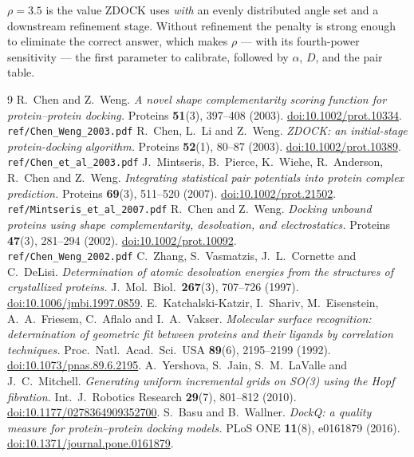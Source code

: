 \documentclass[11pt,a4paper]{article}
\newcommand{\doi}[1]{\href{https://doi.org/#1}{doi:#1}}
\newcommand{\localfile}[1]{\\ \hspace*{1em}\texttt{#1}}
\begin{document}
$\rho = 3.5$ is the value ZDOCK uses \emph{with} an evenly distributed angle set
and a downstream refinement stage. Without refinement the penalty is strong
enough to eliminate the correct answer, which makes $\rho$ --- with its
fourth-power sensitivity --- the first parameter to calibrate, followed by
$\alpha$, $D$, and the pair table.

\begin{thebibliography}{9}
  R.~Chen and Z.~Weng.
  \emph{A novel shape complementarity scoring function for protein--protein
  docking.}
  Proteins \textbf{51}(3), 397--408 (2003). \doi{10.1002/prot.10334}.
  \localfile{ref/Chen\_Weng\_2003.pdf}
  R.~Chen, L.~Li and Z.~Weng.
  \emph{ZDOCK: an initial-stage protein-docking algorithm.}
  Proteins \textbf{52}(1), 80--87 (2003). \doi{10.1002/prot.10389}.
  \localfile{ref/Chen\_et\_al\_2003.pdf}
  J.~Mintseris, B.~Pierce, K.~Wiehe, R.~Anderson, R.~Chen and Z.~Weng.
  \emph{Integrating statistical pair potentials into protein complex
  prediction.}
  Proteins \textbf{69}(3), 511--520 (2007). \doi{10.1002/prot.21502}.
  \localfile{ref/Mintseris\_et\_al\_2007.pdf}
  R.~Chen and Z.~Weng.
  \emph{Docking unbound proteins using shape complementarity, desolvation, and
  electrostatics.}
  Proteins \textbf{47}(3), 281--294 (2002). \doi{10.1002/prot.10092}.
  \localfile{ref/Chen\_Weng\_2002.pdf}
  C.~Zhang, S.~Vasmatzis, J.~L.~Cornette and C.~DeLisi.
  \emph{Determination of atomic desolvation energies from the structures of
  crystallized proteins.}
  J.\ Mol.\ Biol.\ \textbf{267}(3), 707--726 (1997).
  \doi{10.1006/jmbi.1997.0859}.
  E.~Katchalski-Katzir, I.~Shariv, M.~Eisenstein, A.~A.~Friesem, C.~Aflalo and
  I.~A.~Vakser.
  \emph{Molecular surface recognition: determination of geometric fit between
  proteins and their ligands by correlation techniques.}
  Proc.\ Natl.\ Acad.\ Sci.\ USA \textbf{89}(6), 2195--2199 (1992).
  \doi{10.1073/pnas.89.6.2195}.
  A.~Yershova, S.~Jain, S.~M.~LaValle and J.~C.~Mitchell.
  \emph{Generating uniform incremental grids on SO(3) using the Hopf
  fibration.}
  Int.\ J.\ Robotics Research \textbf{29}(7), 801--812 (2010).
  \doi{10.1177/0278364909352700}.
  S.~Basu and B.~Wallner.
  \emph{DockQ: a quality measure for protein--protein docking models.}
  PLoS ONE \textbf{11}(8), e0161879 (2016).
  \doi{10.1371/journal.pone.0161879}.
\end{thebibliography}
\end{document}
